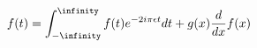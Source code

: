\documentclass[preview]{standalone}
\begin{document}
\begin{align*}
f(t)= \int_{- \infinity}^{\infinity}f(t)e^{-2i\pi\epsilon t}dt + g(x)\frac{d}{dx}f(x)
\end{align*}
\end{document}
